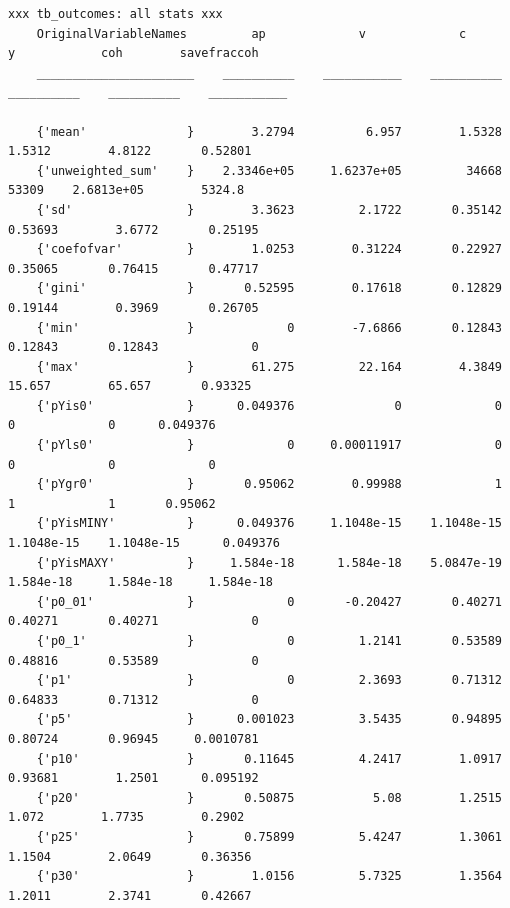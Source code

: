 \documentclass[
]{book}
\begin{document}
\begin{verbatim}
xxx tb_outcomes: all stats xxx
    OriginalVariableNames         ap             v             c             y            coh        savefraccoh
    ______________________    __________    ___________    __________    __________    __________    ___________

    {'mean'              }        3.2794          6.957        1.5328        1.5312        4.8122       0.52801 
    {'unweighted_sum'    }    2.3346e+05     1.6237e+05         34668         53309    2.6813e+05        5324.8 
    {'sd'                }        3.3623         2.1722       0.35142       0.53693        3.6772       0.25195 
    {'coefofvar'         }        1.0253        0.31224       0.22927       0.35065       0.76415       0.47717 
    {'gini'              }       0.52595        0.17618       0.12829       0.19144        0.3969       0.26705 
    {'min'               }             0        -7.6866       0.12843       0.12843       0.12843             0 
    {'max'               }        61.275         22.164        4.3849        15.657        65.657       0.93325 
    {'pYis0'             }      0.049376              0             0             0             0      0.049376 
    {'pYls0'             }             0     0.00011917             0             0             0             0 
    {'pYgr0'             }       0.95062        0.99988             1             1             1       0.95062 
    {'pYisMINY'          }      0.049376     1.1048e-15    1.1048e-15    1.1048e-15    1.1048e-15      0.049376 
    {'pYisMAXY'          }     1.584e-18      1.584e-18    5.0847e-19     1.584e-18     1.584e-18     1.584e-18 
    {'p0_01'             }             0       -0.20427       0.40271       0.40271       0.40271             0 
    {'p0_1'              }             0         1.2141       0.53589       0.48816       0.53589             0 
    {'p1'                }             0         2.3693       0.71312       0.64833       0.71312             0 
    {'p5'                }      0.001023         3.5435       0.94895       0.80724       0.96945     0.0010781 
    {'p10'               }       0.11645         4.2417        1.0917       0.93681        1.2501      0.095192 
    {'p20'               }       0.50875           5.08        1.2515         1.072        1.7735        0.2902 
    {'p25'               }       0.75899         5.4247        1.3061        1.1504        2.0649       0.36356 
    {'p30'               }        1.0156         5.7325        1.3564        1.2011        2.3741       0.42667 

\end{verbatim}
\end{document}
